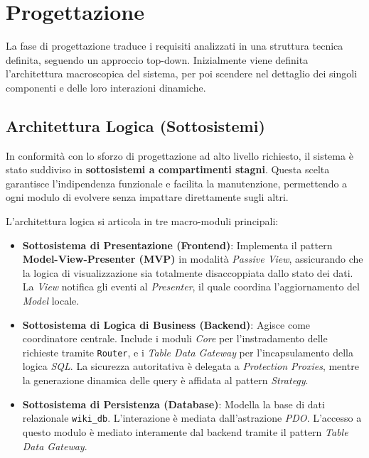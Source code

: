 \chapter{Progettazione}

\noindent La fase di progettazione traduce i requisiti analizzati in una struttura tecnica definita, seguendo un approccio top-down. Inizialmente viene definita l'architettura macroscopica del sistema, per poi scendere nel dettaglio dei singoli componenti e delle loro interazioni dinamiche.

\section{Architettura Logica (Sottosistemi)}

\noindent In conformità con lo sforzo di progettazione ad alto livello richiesto, il sistema è stato suddiviso in \textbf{sottosistemi a compartimenti stagni}. Questa scelta garantisce l'indipendenza funzionale e facilita la manutenzione, permettendo a ogni modulo di evolvere senza impattare direttamente sugli altri.

\noindent L'architettura logica si articola in tre macro-moduli principali:

\begin{itemize}
    \item \textbf{Sottosistema di Presentazione (Frontend)}: Implementa il pattern \textbf{Model-View-Presenter (MVP)} in modalità \textit{Passive View}, assicurando che la logica di visualizzazione sia totalmente disaccoppiata dallo stato dei dati. La \textit{View} notifica gli eventi al \textit{Presenter}, il quale coordina l'aggiornamento del \textit{Model} locale.
    \item \textbf{Sottosistema di Logica di Business (Backend)}: Agisce come coordinatore centrale. Include i moduli \textit{Core} per l'instradamento delle richieste tramite \texttt{Router}, e i \textit{Table Data Gateway} per l'incapsulamento della logica \textit{SQL}. La sicurezza autoritativa è delegata a \textit{Protection Proxies}, mentre la generazione dinamica delle query è affidata al pattern \textit{Strategy}.
    \item \textbf{Sottosistema di Persistenza (Database)}: Modella la base di dati relazionale \texttt{wiki\_db}. L'interazione è mediata dall'astrazione \textit{PDO}. L'accesso a questo modulo è mediato interamente dal backend tramite il pattern \textit{Table Data Gateway}.
\end{itemize}

